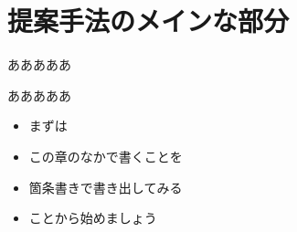 \newpage
\section{提案手法のメインな部分}
あああああ

あああああ

\begin{itemize}
\item まずは
\item この章のなかで書くことを
\item 箇条書きで書き出してみる
\item ことから始めましょう
\end{itemize}